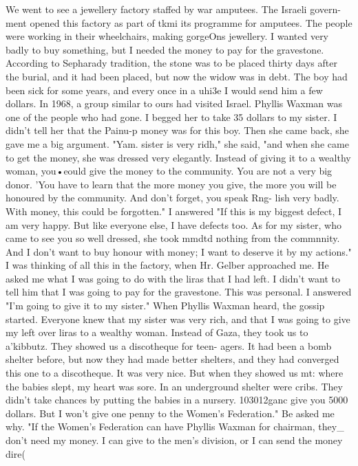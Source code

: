 We went to see a jewellery factory staffed by war amputees.
The Israeli govern-ment 
opened this factory as part of tkmi its programme for amputees.
The people 
were working in their wheelchairs, making gorgeOns jewellery.
I wanted very badly to 
buy something, but I needed the money to pay for the gravestone.
According to Sepharady tradition, the stone was to be placed thirty days after the 
burial, and it had been placed, but now the widow was in debt.
The boy had been sick 
for some years, and every once in a uhi3e I would send him a few dollars.
In 1968, 
a group similar to ours had visited Israel.
Phyllis Waxman was one of the people who 
had gone.
I begged her to take 35 dollars to my sister.
I didn't tell her that the 
Painu-p 
money was for this boy.
Then she came back, she gave me a big argument.
"Yam.
sister 
is very ridh," she said, "and when she came to get the money, she was dressed very 
elegantly.
Instead of giving it to a wealthy woman, you•eould give the money to the 
community.
You are not a very big donor.
'You have to learn that the more money you 
give, the more you will be honoured by the community.
And don't forget, you speak Rng-
lish very badly.
With money, this could be forgotten."
I answered "If this is my biggest defect, I am very happy.
But like everyone else, 
I have defects too.
As for my sister, who came to see you so well dressed, she took mmdtd 
nothing from the commnnity.
And I don't want to buy honour with money; I want to deserve 
it by my actions."
I was thinking of all this in the factory, when Hr.
Gelber approached me.
He asked 
me what I was going to do with the liras that I had left.
I didn't want to tell him 
that I was going to pay for the gravestone.
This was personal.
I answered "I'm going to 
give it to my sister."
When Phyllis Waxman heard, the gossip started.
Everyone knew 
that my sister was very rich, and that I was going to give my left over liras to a 
wealthy woman.
Instead of Gaza, they took us to a'kibbutz.
They showed us a discotheque for teen-
agers.
It had been a bomb shelter before, but now they had made better shelters, and 
they had converged this one to a discotheque.
It was very nice.
But when they showed 
us mt: where the babies slept, my heart was sore.
In an underground shelter were cribs.
They didn't take chances by putting the babies in a nursery.
103012ganc 
give you 5000 dollars.
But I won't give one penny to the Women's Federation."
Be 
asked me why.
"If the Women's Federation can have Phyllis Waxman for chairman, they_ 
don't need my money.
I can give to the men's division, or I can send the money dire( 
